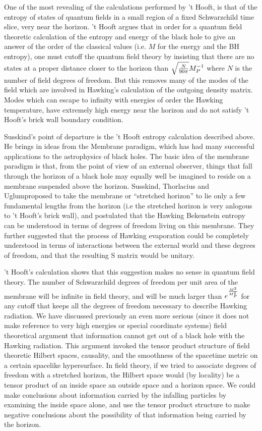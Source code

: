 One of the most revealing of the calculations performed by 't Hooft, is
that of the entropy of states of quantum fields in a small region of a
fixed Schwarzchild time slice, very near the horizon.  't Hooft argues
that in order for a quantum field theoretic calculation of the entropy
and energy of the black hole to give an answer of the order of the
classical values (i.e. $M$ for the energy and the BH entropy), one must
cutoff the quantum field theory by insisting that there are no states
at a proper distance closer to the horizon than $\sqrt{N \over 90\pi}M_P^{-1}$
where $N$ is the number of field degrees of freedom.  But this removes
many of the modes of the field which are involved in Hawking's calculation
of the outgoing density matrix.  Modes which can escape to infinity
with energies of order the Hawking temperature, have extremely high energy
near the horizon and do not satisfy 't Hooft's brick wall boundary
condition.

Susskind's point of departure is the 't Hooft entropy calculation
described above.  He brings in ideas from the Membrane paradigm, which
has had many successful applications to the astrophysics of black holes.
The basic idea of the membrane paradigm is that, from the point of view
of an external observer, things that fall through the horizon of a black
hole may equally well be imagined to reside on a membrane suspended
above the horizon.   Susskind, Thorlacius and Uglum\stretch proposed to take
the membrane or ``stretched horizon'' to lie only a few
fundamental lengths from the horizon (i.e the stretched horizon is very
anlogous to 't Hooft's brick wall), and postulated that the Hawking
Bekenstein entropy can be understood in terms of degrees of freedom
living on this membrane.  They further suggested that the process of Hawking
evaporation
could be completely understood in terms of interactions between the
external world and these degrees of freedom, and that the resulting S
matrix would be unitary.

't Hooft's calculation shows that this suggestion makes no sense in
quantum field theory.  The number of Schwarzchild degrees of freedom per
unit area of the membrane will be infinite in field theory, and will be
much larger than $e^{M^2 \over M_P^2}$ for any cutoff that keeps all the
degrees of freedom necessary to describe Hawking radiation.
We have discussed previously an even more serious (since it does not
make reference to very high energies or special coordinate systems)
field theoretical
argument that information cannot get out of a black hole with the Hawking
radiation.
This argument invoked the tensor product structure of field theoretic
Hilbert spaces, causality, and the smoothness of the spacetime metric on
a certain spacelike hypersurface.  In field theory, if we tried to associate
degrees of freedom with a stretched horizon, the Hilbert space would (by
locality)
be a tensor product of an inside space an outside space and a horizon space.
We could make conclusions about information carried by the infalling particles
by examining the inside space alone, and use the tensor product structure to
make negative conclusions about the possibility of that information being
carried by the horizon.

